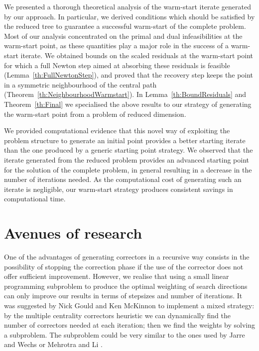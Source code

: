 We presented a thorough theoretical analysis of the warm-start
iterate generated by our approach.
In particular, we derived conditions 
which should be satisfied by the reduced tree to guarantee a successful 
warm-start of the complete problem. 
Most of our analysis concentrated on the primal and dual infeasibilities
at the warm-start point, as these quantities play a major role in the
success of a warm-start iterate.
We obtained bounds on the scaled residuals at the warm-start point
for which a full Newton step aimed at absorbing these residuals
is feasible (Lemma~\ref{th:FullNewtonStep}), and
proved that the recovery step keeps the point in a
symmetric neighbourhood of the central path
(Theorem~\ref{th:NeighbourhoodWarmstart}).
In Lemma~\ref{th:BoundResiduals} and Theorem~\ref{th:Final} we specialised
the above results to our strategy of generating the warm-start
point from a problem of reduced dimension.

We provided computational evidence that this novel way 
of exploiting the problem structure to generate an initial point 
provides a better starting iterate than the one produced by a generic 
starting point strategy.
We observed that the iterate generated from the reduced problem
provides an advanced starting point for the solution of the complete problem,
in general resulting in a decrease in the number of iterations needed.
As the computational cost of generating such an iterate is negligible,
our warm-start strategy produces consistent savings in computational time.


%
%
\section{Avenues of research}

One of the advantages of generating correctors in a recursive way
consists in the possibility of stopping the correction phase
if the use of the corrector does not offer sufficient improvement.
However, we realise that using a small linear programming subproblem
to produce the optimal weighting of search directions can only improve
our results in terms of stepsizes and number of iterations.
It was suggested by Nick Gould and Ken McKinnon to implement a mixed strategy:
by the multiple centrality correctors heuristic we can dynamically
find the number of correctors needed at each iteration; then we find
the weights by solving a subproblem.
The subproblem could be very similar to the ones used by
Jarre and Wechs \cite{JarreWechs} or Mehrotra and Li \cite{MehrotraLi}.

